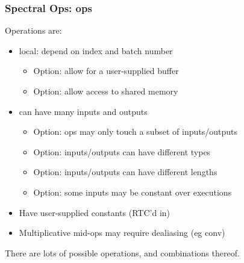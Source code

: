 \documentclass[10pt,aspectratio=169]{beamer}
\begin{document}
\begin{frame}
  \frametitle{Spectral Ops: ops}

  \medskip
  Operations are:
  \begin{itemize}
  \item local: depend on index and batch number
    \begin{itemize}
    \item Option: allow for a user-supplied buffer
    \item Option: allow access to shared memory
      \end{itemize}
  \item can have many inputs and outputs
    \begin{itemize}
    \item Option: ops may only touch a subset of inputs/outputs
    \item Option: inputs/outputs can have different types
    \item Option: inputs/outputs can have different lengths
    \item Option: some inputs may be constant over executions
    \end{itemize}
  \item Have user-supplied constants (RTC'd in)
  \item Multiplicative mid-ops may require dealiasing (eg conv)
  \end{itemize}

  \bigskip

  There are lots of possible operations, and combinations thereof.


\end{frame}
  
\end{document}
